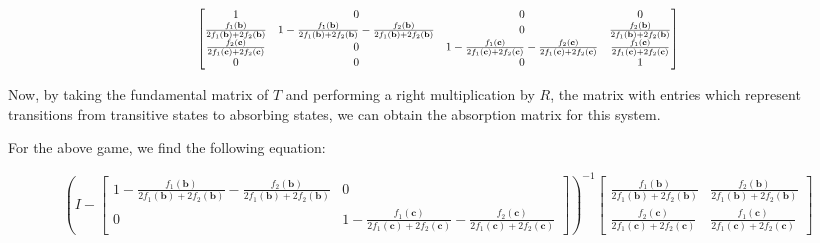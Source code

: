 \documentclass{article}
\begin{document}
\begin{equation}
    \resizebox{\textwidth}{!}{$
    \begin{bmatrix}
        1 & 0 & 0 & 0\\
        \frac{f_{1}(\mathbf{b})}{2 f_{1}(\mathbf{b}) + 2 f_{2}(\mathbf{b})} &
        1 - \frac{f_{1}(\mathbf{b})}{2 f_{1}(\mathbf{b}) + 2 f_{2}(\mathbf{b})}
        - \frac{f_{2}(\mathbf{b})}{2 f_{1}(\mathbf{b}) + 2 f_{2}(\mathbf{b})} &
        0 &
        \frac{f_{2}(\mathbf{b})}{2 f_{1}(\mathbf{b}) + 2 f_{2}(\mathbf{b})}\\
        \frac{f_{2}(\mathbf{c})}{2 f_{1}(\mathbf{c}) + 2 f_{2}(\mathbf{c})} &
        0 &
        1 - \frac{f_{1}(\mathbf{c})}{2 f_{1}(\mathbf{c}) + 2 f_{2}(\mathbf{c})}
        - \frac{f_{2}(\mathbf{c})}{2 f_{1}(\mathbf{c}) + 2 f_{2}(\mathbf{c})} &
        \frac{f_{1}(\mathbf{c})}{2 f_{1}(\mathbf{c}) + 2 f_{2}(\mathbf{c})}\\
        0 & 0 & 0 & 1
    \end{bmatrix}$}
    \label{eqn:2x2_Moran_Transition}
\end{equation}


Now, by taking the fundamental matrix of \(T\) and performing a right
multiplication by \(R\), the matrix with entries which represent transitions
from transitive states to absorbing
states\cite{f66ea2a5-f1c3-3855-8dc0-e3047d83298e}, we can obtain the absorption
matrix for this system.

For the above game, we find the following equation:

\begin{equation}
    \left(I - \begin{bmatrix}1 - \frac{f_{1}{\left(\textbf{b} \right)}}{2 f_{1}{\left(\textbf{b} \right)} + 2 f_{2}{\left(\textbf{b} \right)}} - \frac{f_{2}{\left(\textbf{b} \right)}}{2 f_{1}{\left(\textbf{b} \right)} + 2 f_{2}{\left(\textbf{b} \right)}} & 0\\0 & 1 - \frac{f_{1}{\left(\textbf{c} \right)}}{2 f_{1}{\left(\textbf{c} \right)} + 2 f_{2}{\left(\textbf{c} \right)}} - \frac{f_{2}{\left(\textbf{c} \right)}}{2 f_{1}{\left(\textbf{c} \right)} + 2 f_{2}{\left(\textbf{c} \right)}}\end{bmatrix}\right)^{-1}
        \begin{bmatrix}
            \frac{f_{1}{\left(\textbf{b} \right)}}{2 f_{1}{\left(\textbf{b} \right)} + 2 f_{2}{\left(\textbf{b} \right)}} & \frac{f_{2}{\left(\textbf{b} \right)}}{2 f_{1}{\left(\textbf{b} \right)} + 2 f_{2}{\left(\textbf{b} \right)}}\\\frac{f_{2}{\left(\textbf{c} \right)}}{2 f_{1}{\left(\textbf{c} \right)} + 2 f_{2}{\left(\textbf{c} \right)}} & \frac{f_{1}{\left(\textbf{c} \right)}}{2 f_{1}{\left(\textbf{c} \right)} + 2 f_{2}{\left(\textbf{c} \right)}}
        \end{bmatrix}
\end{equation}
\end{document}
